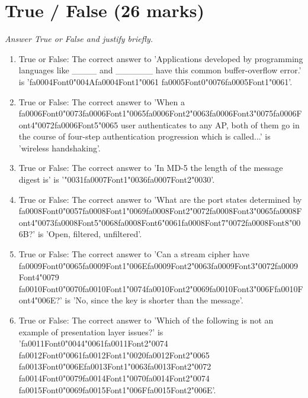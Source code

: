 \documentclass[12pt]{article}
\begin{document}
\section*{True / False (26 marks)}
\textit{Answer True or False and justify briefly.}
\begin{enumerate}[label=\arabic*.]
\item True or False: The correct answer to 'Applications developed by programming languages like \_\_\_\_ and \_\_\_\_\_\_ have this common buffer-overflow error.' is '{\csname fa0004Font0\endcsname\char"004A}{\csname fa0004Font1\endcsname\char"0061} {\csname fa0005Font0\endcsname\char"0076}{\csname fa0005Font1\endcsname\char"0061}'.
\item True or False: The correct answer to 'When a {\csname fa0006Font0\endcsname\char"0073}{\csname fa0006Font1\endcsname\char"0065}{\csname fa0006Font2\endcsname\char"0063}{\csname fa0006Font3\endcsname\char"0075}{\csname fa0006Font4\endcsname\char"0072}{\csname fa0006Font5\endcsname\char"0065} user authenticates to any AP, both of them go in the course of four-step authentication progression which is called...' is 'wireless handshaking'.
\item True or False: The correct answer to 'In MD-5 the length of the message digest is' is '{\char"0031}{\csname fa0007Font1\endcsname\char"0036}{\csname fa0007Font2\endcsname\char"0030}'.
\item True or False: The correct answer to 'What are the port states determined by {\csname fa0008Font0\endcsname\char"0057}{\csname fa0008Font1\endcsname\char"0069}{\csname fa0008Font2\endcsname\char"0072}{\csname fa0008Font3\endcsname\char"0065}{\csname fa0008Font4\endcsname\char"0073}{\csname fa0008Font5\endcsname\char"0068}{\csname fa0008Font6\endcsname\char"0061}{\csname fa0008Font7\endcsname\char"0072}{\csname fa0008Font8\endcsname\char"006B}?' is 'Open, filtered, unfiltered'.
\item True or False: The correct answer to 'Can a stream cipher have {\csname fa0009Font0\endcsname\char"0065}{\csname fa0009Font1\endcsname\char"006E}{\csname fa0009Font2\endcsname\char"0063}{\csname fa0009Font3\endcsname\char"0072}{\csname fa0009Font4\endcsname\char"0079} {\csname fa0010Font0\endcsname\char"0070}{\csname fa0010Font1\endcsname\char"0074}{\csname fa0010Font2\endcsname\char"0069}{\csname fa0010Font3\endcsname\char"006F}{\csname fa0010Font4\endcsname\char"006E}?' is 'No, since the key is shorter than the message'.
\item True or False: The correct answer to 'Which of the following is not an example of presentation layer issues?' is '{\csname fa0011Font0\endcsname\char"0044}{\char"0061}{\csname fa0011Font2\endcsname\char"0074} {\csname fa0012Font0\endcsname\char"0061}{\csname fa0012Font1\endcsname\char"0020}{\csname fa0012Font2\endcsname\char"0065} {\csname fa0013Font0\endcsname\char"006E}{\csname fa0013Font1\endcsname\char"0063}{\csname fa0013Font2\endcsname\char"0072} {\csname fa0014Font0\endcsname\char"0079}{\csname fa0014Font1\endcsname\char"0070}{\csname fa0014Font2\endcsname\char"0074} {\csname fa0015Font0\endcsname\char"0069}{\csname fa0015Font1\endcsname\char"006F}{\csname fa0015Font2\endcsname\char"006E}'.

\end{enumerate}
\end{document}
